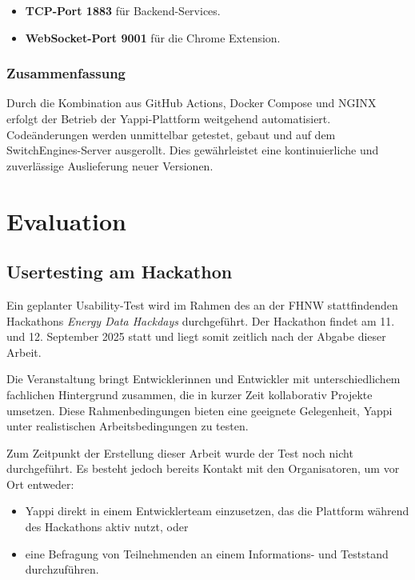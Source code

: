 \documentclass[12pt,a4paper]{report}
\begin{document}
    \begin{itemize}
        \item \textbf{TCP-Port 1883} für Backend-Services.
        \item \textbf{WebSocket-Port 9001} für  die Chrome Extension.
    \end{itemize}

    \subsection{Zusammenfassung}

    Durch die Kombination aus GitHub Actions, Docker Compose und NGINX erfolgt der Betrieb der Yappi-Plattform weitgehend automatisiert.
    Codeänderungen werden unmittelbar getestet, gebaut und auf dem SwitchEngines-Server ausgerollt. Dies gewährleistet eine kontinuierliche und zuverlässige Auslieferung neuer Versionen.


\chapter{Evaluation}

 \section{Usertesting am Hackathon}

 Ein geplanter Usability-Test wird im Rahmen des an der FHNW stattfindenden Hackathons \textit{Energy Data Hackdays} durchgeführt.
 Der Hackathon findet am 11. und 12. September 2025 statt und liegt somit zeitlich nach der Abgabe dieser Arbeit.

 Die Veranstaltung bringt Entwicklerinnen und Entwickler mit unterschiedlichem fachlichen Hintergrund zusammen, die in
 kurzer Zeit kollaborativ Projekte umsetzen. Diese Rahmenbedingungen bieten eine geeignete Gelegenheit, Yappi unter
 realistischen Arbeitsbedingungen zu testen.

 Zum Zeitpunkt der Erstellung dieser Arbeit wurde der Test noch nicht durchgeführt. Es besteht jedoch bereits Kontakt mit
 den Organisatoren, um vor Ort entweder:
 \begin{itemize}
     \item Yappi direkt in einem Entwicklerteam einzusetzen, das die Plattform während des Hackathons aktiv nutzt, oder
     \item eine Befragung von Teilnehmenden an einem Informations- und Teststand durchzuführen.
 \end{itemize}
\end{document}

